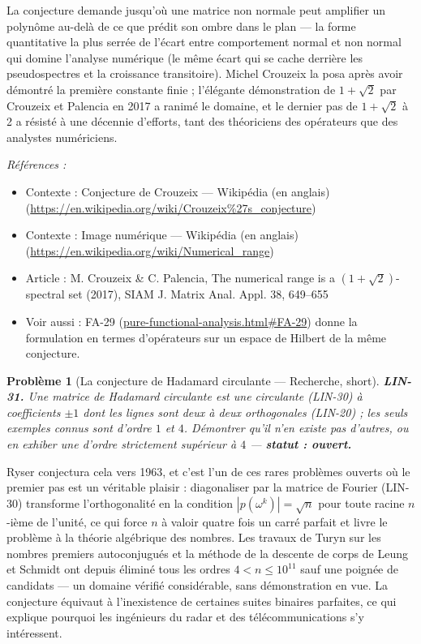 \documentclass[11pt]{article}
\newtheorem{problem}{Problème}
\newenvironment{refs}{\par\small\noindent\emph{Références :}\begin{itemize}\setlength\itemsep{0pt}}{\end{itemize}\normalsize}
\begin{document}
\noindent La conjecture demande jusqu'où une matrice non normale peut amplifier un polynôme
au-delà de ce que prédit son \og{} ombre \fg{} dans le plan --- la forme quantitative la plus serrée de l'écart
entre comportement normal et non normal qui domine l'analyse numérique (le même écart qui se cache
derrière les pseudospectres et la croissance transitoire). Michel Crouzeix la posa après avoir démontré
la première constante finie ; l'élégante démonstration de $1 + \sqrt 2$ par Crouzeix et Palencia en
2017 a ranimé le domaine, et le dernier pas de $1+\sqrt{2}$ à 2 a résisté à une décennie d'efforts,
tant des théoriciens des opérateurs que des analystes numériciens.

\begin{refs}
\item Contexte : Conjecture de Crouzeix --- Wikipédia (en anglais) (\url{https://en.wikipedia.org/wiki/Crouzeix%27s_conjecture})
\item Contexte : Image numérique --- Wikipédia (en anglais) (\url{https://en.wikipedia.org/wiki/Numerical_range})
\item Article : M. Crouzeix \& C. Palencia, \og{} The numerical range is a $(1+\sqrt{2})$-spectral set \fg{} (2017), SIAM J. Matrix Anal. Appl. 38, 649--655
\item Voir aussi : FA-29 (\url{pure-functional-analysis.html#FA-29}) donne la formulation en termes d'opérateurs sur un espace de Hilbert de la même conjecture.
\end{refs}

\bigskip

\begin{problem}[{La conjecture de Hadamard circulante --- Recherche, short}]
\textbf{LIN-31.} Une matrice de Hadamard circulante est une circulante (LIN-30) à
coefficients $\pm 1$ dont les lignes sont deux à deux orthogonales (LIN-20) ; les seuls exemples
connus sont d'ordre $1$ et $4$. Démontrer qu'il n'en existe pas d'autres, ou en exhiber une d'ordre
strictement supérieur à $4$ --- \textbf{statut : ouvert.}
\end{problem}

\noindent Ryser conjectura cela vers 1963, et c'est l'un de ces rares problèmes ouverts où le
premier pas est un véritable plaisir : diagonaliser par la matrice de Fourier (LIN-30) transforme
l'orthogonalité en la condition $|p(\omega^k)| = \sqrt{n}$ pour toute racine $n$-ième de l'unité,
ce qui force $n$ à valoir quatre fois un carré parfait et livre le problème à la théorie algébrique
des nombres. Les travaux de Turyn sur les nombres premiers autoconjugués et la méthode de la
\og{} descente de corps \fg{} de Leung et Schmidt ont depuis éliminé tous les ordres $4 < n \le 10^{11}$
sauf une poignée de candidats --- un domaine vérifié considérable, sans démonstration en vue. La
conjecture équivaut à l'inexistence de certaines suites binaires parfaites, ce qui explique pourquoi
les ingénieurs du radar et des télécommunications s'y intéressent.
\end{document}
